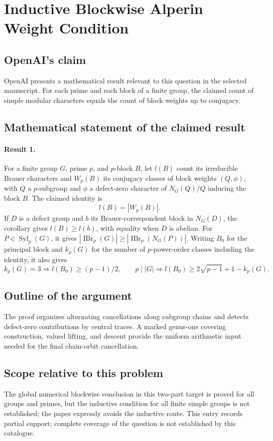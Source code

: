 \documentclass[11pt]{article}
\begin{document}
\section*{Inductive Blockwise Alperin Weight Condition}

\subsection{OpenAI's claim}
OpenAI presents a mathematical result relevant to this question in the selected manuscript. For each prime and each block of a finite group, the claimed count of simple modular characters equals the count of block weights up to conjugacy.

\subsection{Mathematical statement of the claimed result}
\paragraph{Result 1.} For a finite group \(G\), prime \(p\), and \(p\)-block \(B\), let \(l(B)\) count its irreducible Brauer characters and \(W_p(B)\) its conjugacy classes of block weights \((Q,\phi)\), with \(Q\) a \(p\)-subgroup and \(\phi\) a defect-zero character of \(N_G(Q)/Q\) inducing the block \(B\). The claimed identity is
\[
 l(B)=|W_p(B)|.
\]
If \(D\) is a defect group and \(b\) its Brauer-correspondent block in \(N_G(D)\), the corollary gives \(l(B)\ge l(b)\), with equality when \(D\) is abelian. For \(P\in\operatorname{Syl}_p(G)\), it gives \(|\operatorname{IBr}_p(G)|\ge|\operatorname{IBr}_p(N_G(P))|\). Writing \(B_0\) for the principal block and \(k_p(G)\) for the number of \(p\)-power-order classes including the identity, it also gives
\[
 k_p(G)=3\Rightarrow l(B_0)\ge(p-1)/2,\qquad
 p\mid|G|\Rightarrow l(B_0)\ge2\sqrt{p-1}+1-k_p(G).
\]

\subsection{Outline of the argument}
The proof organizes alternating cancellations along subgroup chains and detects defect-zero contributions by central traces. A marked genus-one covering construction, valued lifting, and descent provide the uniform arithmetic input needed for the final chain-orbit cancellation.

\subsection{Scope relative to this problem}
The global numerical blockwise conclusion in this two-part target is proved for all groups and primes, but the inductive condition for all finite simple groups is not established; the paper expressly avoids the inductive route. This entry records partial support; complete coverage of the question is not established by this catalogue.
\end{document}
